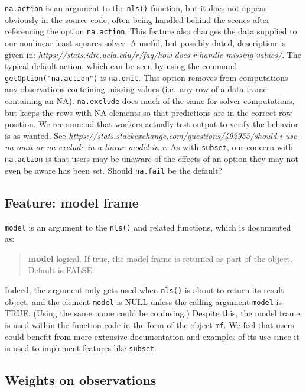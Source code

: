 \texttt{na.action} is an argument to the \texttt{nls()} function, but it does not appear
obviously in the source code, often being handled behind the scenes after
referencing the option \texttt{na.action}. This feature also changes the data
supplied to our nonlinear least squares solver.
A useful, but possibly dated, description is given in:
\emph{\url{https://stats.idre.ucla.edu/r/faq/how-does-r-handle-missing-values/}}.
The typical default action, which can be seen by using the command
\texttt{getOption("na.action")}
is \texttt{na.omit}. This option removes from computations any observations
containing missing values (i.e.~any row of a data frame containing an NA).
\texttt{na.exclude} does much of the same for solver computations, but keeps the rows with
NA elements so that predictions are in the correct row position. We recommend that
workers actually test output to verify the behavior is as wanted.
See \emph{\url{https://stats.stackexchange.com/questions/492955/should-i-use-na-omit-or-na-exclude-in-a-linear-model-in-r}}.
As with \texttt{subset}, our concern with \texttt{na.action} is that users may be unaware of the
effects of an option they may not even be aware has been set. Should \texttt{na.fail} be the default?

\hypertarget{feature-model-frame}{%
\subsection{Feature: model frame}\label{feature-model-frame}}

\texttt{model} is an argument to the \texttt{nls()} and related functions, which is documented as:

\begin{quote}
\textbf{model} logical. If true, the model frame is returned as part of the object. Default is FALSE.
\end{quote}

Indeed, the argument only gets used when \texttt{nls()} is about to return its result
object, and the
element \texttt{model} is NULL unless the calling argument \texttt{model} is TRUE. (Using the same
name could
be confusing.) Despite this, the model frame is used within the function code in
the form of the object
\texttt{mf}. We feel that users could benefit from more extensive documentation and
examples of its use since it is used to implement features like \texttt{subset}.

\hypertarget{weights-on-observations}{%
\subsection{Weights on observations}\label{weights-on-observations}}

